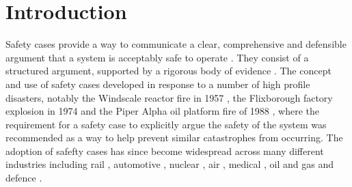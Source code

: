 \section{Introduction}
\label{sec:intro}

Safety cases provide a way to communicate a clear, comprehensive and defensible argument that a system is acceptably safe to operate \cite{kelly1999arguing}. They consist of a structured argument, supported by a rigorous body of evidence \cite{0056}. The concept and use of safety cases developed in response to a number of high profile disasters, notably the Windscale reactor fire in 1957 \cite{penney2017report}, the Flixborough factory explosion in 1974 \cite{flix} and the Piper Alpha oil platform fire of 1988 \cite{cullen1993public}, where the requirement for a safety case to explicitly argue the safety of the system was recommended as a way to help prevent similar catastrophes from occurring. The adoption of safefty cases has since become widespread across many different industries including rail \cite{std2019railway}, automotive \cite{26262}, nuclear \cite{onr}, air \cite{icao}, medical \cite{tir382019medical}, oil and gas \cite{hse2006offshore} and defence \cite{mod}.

